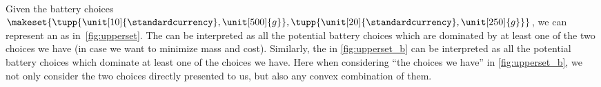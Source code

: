 \begin{marginfigure}
    \\
    \caption{}
\end{marginfigure}
%

Given the battery choices~$\makeset{\tupp{\unit[10]{\standardcurrency},\unit[500]{g}}, \tupp{\unit[20]{\standardcurrency},\unit[250]{g}}}$, we can represent an  as in~\cref{fig:upperset}.
The  can be interpreted as all the potential battery choices which are dominated by at least one of the two choices we have (in case we want to minimize mass and cost).
Similarly, the  in \cref{fig:upperset_b} can be interpreted as all the potential battery choices which dominate at least one of the choices we have.
Here when considering ``the choices we have'' in \cref{fig:upperset_b}, we not only consider the two choices directly presented to us, but also any convex combination of them.

